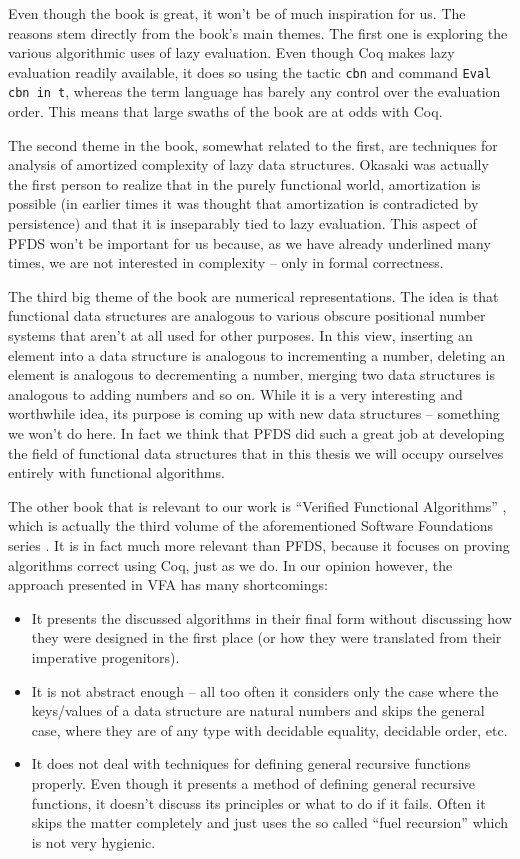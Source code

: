 \documentclass[declaration,mgr,english,shortabstract]{iithesis}
\newcommand{\m}[1]{\texttt{#1}}
\begin{document}
Even though the book is great, it won't be of much inspiration for us. The reasons stem directly from the book's main themes. The first one is exploring the various algorithmic uses of lazy evaluation. Even though Coq makes lazy evaluation readily available, it does so using the tactic \m{cbn} and command \m{Eval cbn in t}, whereas the term language has barely any control over the evaluation order. This means that large swaths of the book are at odds with Coq.

The second theme in the book, somewhat related to the first, are techniques for analysis of amortized complexity of lazy data structures. Okasaki was actually the first person to realize that in the purely functional world, amortization is possible (in earlier times it was thought that amortization is contradicted by persistence) and that it is inseparably tied to lazy evaluation. This aspect of PFDS won't be important for us because, as we have already underlined many times, we are not interested in complexity -- only in formal correctness.

The third big theme of the book are numerical representations. The idea is that functional data structures are analogous to various obscure positional number systems that aren't at all used for other purposes. In this view, inserting an element into a data structure is analogous to incrementing a number, deleting an element is analogous to decrementing a number, merging two data structures is analogous to adding numbers and so on. While it is a very interesting and worthwhile idea, its purpose is coming up with new data structures -- something we won't do here. In fact we think that PFDS did such a great job at developing the field of functional data structures that in this thesis we will occupy ourselves entirely with functional algorithms.

The other book that is relevant to our work is ``Verified Functional Algorithms'' \cite{VFA}, which is actually the third volume of the aforementioned Software Foundations series \cite{SoftwareFoundations}. It is in fact much more relevant than PFDS, because it focuses on proving algorithms correct using Coq, just as we do. In our opinion however, the approach presented in VFA has many shortcomings:

\begin{itemize}
    \item It presents the discussed algorithms in their final form without discussing how they were designed in the first place (or how they were translated from their imperative progenitors).
    \item It is not abstract enough -- all too often it considers only the case where the keys/values of a data structure are natural numbers and skips the general case, where they are of any type with decidable equality, decidable order, etc.
    \item It does not deal with techniques for defining general recursive functions properly. Even though it presents a method of defining general recursive functions, it doesn't discuss its principles or what to do if it fails. Often it skips the matter completely and just uses the so called ``fuel recursion'' which is not very hygienic.
\end{itemize}
\end{document}
